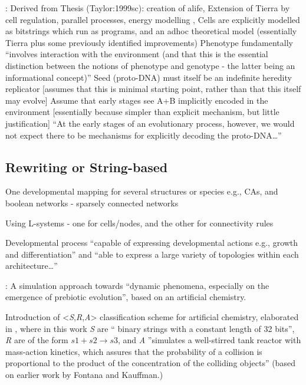 \parencite{Taylor2001}:
Derived from Thesis (Taylor:1999sc): creation of \gls{alife}, Extension of Tierra \cite{Ray1991} by cell regulation, parallel processes, energy modelling \cite[p.4]{Taylor:1999sc}, Cells are explicitly modelled as bitstrings which run as programs, and an adhoc theoretical model (essentially Tierra plus some previously identified improvements)
Phenotype fundamentally ``involves interaction with the environment (and that this is the essential distinction between the notions of phenotype and genotype - the latter being an informational concept)'' \parencite{Taylor2001}
Seed (proto-DNA) must itself be an indefinite heredity replicator {[}assumes that this is minimal starting point, rather than that this itself may evolve{]} \parencite{Taylor2001}
Assume that early stages see A+B implicitly encoded in the environment {[}essentially because simpler than explicit mechanism, but little justification{]} ``At the early stages of an evolutionary process, however, we would not expect there to be mechanisms for explicitly decoding the proto-DNA\ldots{}'' \parencite{Taylor2001}
		
\subsection{Rewriting or String-based}

\parencite{Antonakopoulos:2011th}

One developmental mapping for several structures or species e.g., CAs, and boolean networks - sparsely connected networks

Using L-systems - one for cells/nodes, and the other for connectivity rules

Developmental process ``capable of expressing developmental actions e.g., growth and differentiation'' and ``able to express a large variety of topologies within each architecture\ldots{}''

\cite{Dittrich1998}:
A simulation approach towards ``dynamic phenomena, especially on the emergence of prebiotic evolution'', based on an artificial chemistry.

Introduction of \textless{}\emph{S},\emph{R},\emph{A}\textgreater{} classification scheme for artificial chemistry, elaborated in \parencite{Dittrich:2001zr}, where in this work \emph{S} are `` binary strings with a constant length of 32 bits'', \emph{R} are of the form $s1+s2 \rightarrow s3$, and \emph{A} ''simulates a well-stirred tank reactor with mass-action kinetics, which assures that the probability of a collision is proportional to the product of the concentration of the colliding objects'' (based on earlier work by Fontana and Kauffman.)

